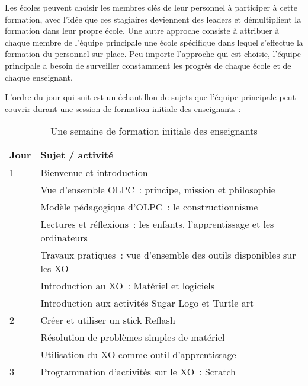 \documentclass[11pt]{article}
\begin{document}
Les écoles peuvent choisir les membres clés de leur personnel à participer
à cette formation, avec l'idée que ces stagiaires deviennent des leaders et
démultiplient la formation dans leur propre école. Une autre approche
consiste à attribuer à chaque membre de l'équipe principale une école
spécifique dans lequel s'effectue la formation du personnel sur place. Peu
importe l'approche qui est choisie, l'équipe principale a besoin de
surveiller constamment les progrès de chaque école et de chaque
enseignant.

L'ordre du jour qui suit est un échantillon de sujets que l'équipe
principale peut couvrir durant une session de formation initiale des
enseignants :

\begin{table}[htb]
\caption{Une semaine de formation initiale des enseignants} 
\begin{center}
\begin{tabular}{|l|l|}
\hline
 Jour  &  Sujet / activité                                                                    \\
\hline
    1  &  Bienvenue et introduction                                                           \\
       &  Vue d’ensemble OLPC : principe, mission et philosophie                              \\
       &  Modèle pédagogique d’OLPC : le constructionnisme                                    \\
       &  Lectures et réflexions : les enfants, l’apprentissage et les ordinateurs            \\
       &  Travaux pratiques : vue d’ensemble des outils disponibles sur les XO                \\
       &  Introduction au XO : Matériel et logiciels                                          \\
\hline
       &  Introduction aux activités Sugar Logo et Turtle art                                 \\
    2  &  Créer et utiliser un stick Reflash                                                  \\
       &  Résolution de problèmes simples de matériel                                         \\
       &  Utilisation du XO comme outil d’apprentissage                                       \\
\hline
    3  &  Programmation d’activités sur le XO : Scratch                                       \\

\end{tabular}
\end{center}
\end{table}
\end{document}
